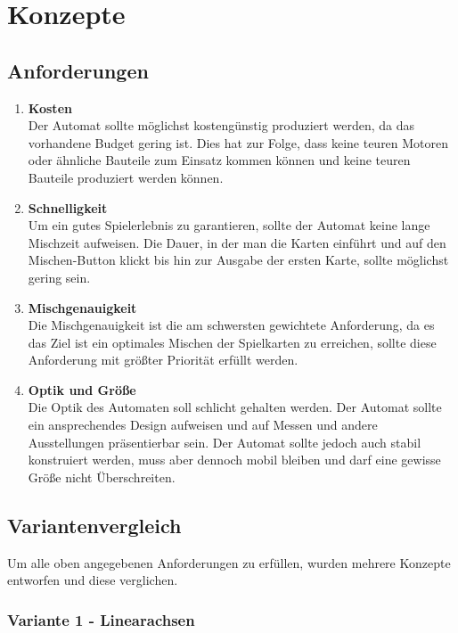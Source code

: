 \section{Konzepte}

\subsection{Anforderungen}

\begin{enumerate}
    \item \textbf{Kosten}  \\
    Der Automat sollte möglichst kostengünstig produziert werden,
    da das vorhandene Budget gering ist. Dies hat zur Folge, dass keine teuren Motoren
    oder ähnliche Bauteile zum Einsatz kommen können und keine teuren Bauteile produziert
    werden können.
    \item \textbf{Schnelligkeit} \\
    Um ein gutes Spielerlebnis zu garantieren, sollte der Automat keine
    lange Mischzeit aufweisen. Die Dauer, in der man die Karten einführt und auf den
    Mischen-Button klickt bis hin zur Ausgabe der ersten Karte, sollte möglichst gering sein.
    \item \textbf{Mischgenauigkeit} \\
    Die Mischgenauigkeit ist die am schwersten gewichtete Anforderung,
    da es das Ziel ist ein optimales Mischen der Spielkarten zu erreichen, sollte
    diese Anforderung mit größter Priorität erfüllt werden.
    \item \textbf{Optik und Größe} \\
    Die Optik des Automaten soll schlicht gehalten werden. Der Automat sollte ein ansprechendes Design aufweisen und
    auf Messen und andere Ausstellungen präsentierbar sein. Der Automat
    sollte jedoch auch stabil konstruiert werden, muss aber dennoch mobil bleiben und
    darf eine gewisse Größe nicht Überschreiten.
\end{enumerate}

\subsection{Variantenvergleich}
Um alle oben angegebenen Anforderungen zu erfüllen, wurden mehrere Konzepte entworfen und diese verglichen.

\subsubsection{Variante 1 - Linearachsen}


